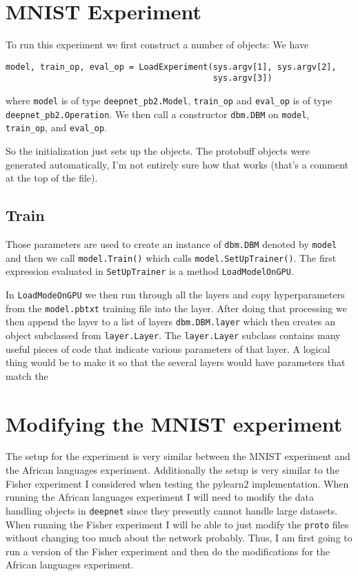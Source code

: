 \documentclass{article} %
\begin{document}
\section{MNIST Experiment}

To run this experiment we first construct a number of objects:
We have
\begin{verbatim}
model, train_op, eval_op = LoadExperiment(sys.argv[1], sys.argv[2],
                                          sys.argv[3])
\end{verbatim}
where \texttt{model} is of type \texttt{deepnet\_pb2.Model}, \texttt{train\_op} and
\texttt{eval\_op} is of type \texttt{deepnet\_pb2.Operation}.  We then call
a constructor \texttt{dbm.DBM} on \texttt{model}, \texttt{train\_op}, and \texttt{eval\_op}.

So the initialization just sets up the objects.  The protobuff objects were generated automatically,
I'm not entirely sure how that works (that's a comment at the top of the file).

\subsection{Train}

Those parameters are used to create an instance of \texttt{dbm.DBM} denoted by \texttt{model}
and then we call \texttt{model.Train()} which calls \texttt{model.SetUpTrainer()}.  The first expression
evaluated in \texttt{SetUpTrainer} is a method \texttt{LoadModelOnGPU}.

In \texttt{LoadModeOnGPU} we then run through all the layers and copy hyperparameters from the \texttt{model.pbtxt}
training file into the layer.  After doing that processing we then append the layer
to a list of layers \texttt{dbm.DBM.layer} which then creates an object subclassed from \texttt{layer.Layer}.
The \texttt{layer.Layer} subclass contains many useful pieces of code that indicate various parameters of that layer.
A logical thing would be to make it so that the several layers would have parameters that match the 

\section{Modifying the MNIST experiment}

The setup for the experiment is very similar between the MNIST experiment and the African languages
experiment. Additionally the setup is very similar to the Fisher experiment I considered when testing 
the pylearn2 implementation.  When running the African languages experiment I will need to modify the 
data handling objects in \texttt{deepnet} since they presently cannot handle large datasets.
When running the Fisher experiment I will be able to just modify the \texttt{proto} files
without changing too much about the network probably. Thus, I am first going to run a version of the 
Fisher experiment and then do the modifications for the African languages experiment.
\end{document}
